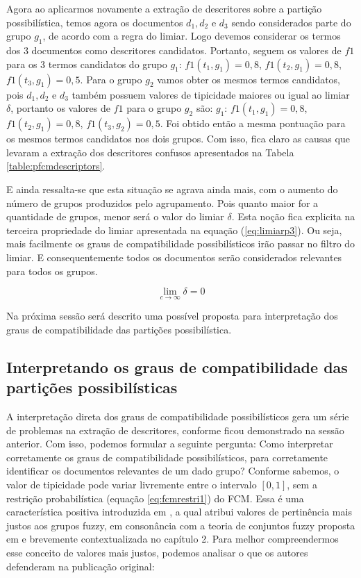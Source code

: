 Agora ao aplicarmos novamente a extração de descritores sobre a partição possibilística, temos agora
os documentos $d_1, d_2$ e $d_3$ sendo considerados parte do grupo $g_1$, de acordo com a regra do
limiar. Logo devemos considerar os termos dos 3 documentos como descritores candidatos. Portanto,
seguem os valores de $f1$ para os 3 termos candidatos do grupo $g_1$: $f1(t_1,g_1) = 0,8$,
$f1(t_2,g_1) = 0,8$, $f1(t_3,g_1) = 0,5$. Para o grupo $g_2$ vamos obter os mesmos termos
candidatos, pois $d_1, d_2$ e $d_3$ também possuem valores de tipicidade maiores ou igual ao limiar
$\delta$, portanto os valores de $f1$ para o grupo $g_2$ são:  $g_1$: $f1(t_1,g_1) = 0,8$,
$f1(t_2,g_1) = 0,8$, $f1(t_3,g_2) = 0,5$. Foi obtido então a mesma pontuação para os mesmos termos
candidatos nos dois grupos. Com isso, fica claro as causas que levaram a extração dos descritores
confusos apresentados na Tabela \ref{table:pfcmdescriptors}. 

E ainda ressalta-se que esta situação
se agrava ainda mais, com o aumento do número de grupos produzidos pelo agrupamento. Pois quanto
maior for a quantidade de grupos, menor será o valor do limiar $\delta$. Esta noção fica explicita
na terceira propriedade do limiar apresentada na equação (\ref{eq:limiarp3}). Ou seja, mais
facilmente os graus de compatibilidade possibilísticos irão passar no filtro do limiar. E
consequentemente todos os documentos serão considerados relevantes para todos os grupos. 

\begin{equation}
  \lim_{c \rightarrow \infty} \delta = 0
  \label{eq:limiarp3}
\end{equation}


Na próxima sessão será descrito uma possível proposta para interpretação dos graus de
compatibilidade das partições possibilística.

\subsection{Interpretando os graus de compatibilidade das partições possibilísticas}

A interpretação direta dos graus de compatibilidade possibilísticos gera um série de problemas na
extração de descritores, conforme ficou demonstrado na sessão anterior. Com isso, podemos formular a
seguinte pergunta: Como interpretar corretamente os graus de compatibilidade possibilísticos, para
corretamente identificar os documentos relevantes de um dado grupo? Conforme sabemos, o valor de
tipicidade pode variar livremente entre o intervalo $[0,1]$, sem a restrição probabilística
(equação \ref{eq:fcmrestri1}) do FCM. Essa é uma
característica positiva introduzida em , a qual atribui valores de
pertinência mais justos aos grupos fuzzy, em consonância com a teoria de conjuntos fuzzy proposta em
 e brevemente contextualizada no capítulo 2. Para melhor compreendermos esse
conceito de valores mais justos, podemos analisar o que os autores defenderam na publicação
original:

